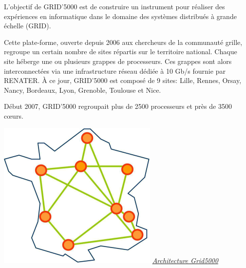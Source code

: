 L’objectif de GRID’5000 est de construire un instrument
pour réaliser des expériences en informatique dans le
domaine des systèmes distribués à grande échelle (GRID).

Cette plate-forme, ouverte depuis 2006 aux chercheurs de
la communauté grille, regroupe un certain nombre de sites
répartis sur le territoire national. Chaque site héberge une
ou plusieurs grappes de processeurs. Ces grappes sont
alors interconnectées via une infrastructure réseau dédiée
à 10 Gb/s fournie par RENATER. À ce jour, GRID’5000
est composé de 9 sites: Lille, Rennes, Orsay, Nancy,
Bordeaux, Lyon, Grenoble, Toulouse et Nice.

Début 2007, GRID’5000 regroupait plus de 2500 processeurs et près
de 3500 cœurs.

\newpage
\begin{center}
\includegraphics{images/g5k.png}
\underline{\textit{Architecture Grid5000}}
\end{center}



